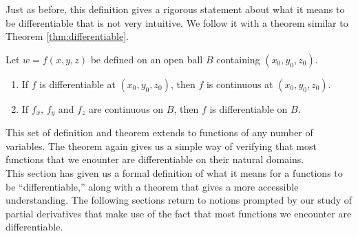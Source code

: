 Just as before, this definition gives a rigorous statement about what it means to be differentiable that is not very intuitive. We follow it with a theorem similar to Theorem \ref{thm:differentiable}.

{Let $w=f(x,y,z)$ be defined on an open ball $B$ containing $(x_0,y_0,z_0)$. 
\begin{enumerate}
\item	If $f$ is differentiable at $(x_0,y_0,z_0)$, then $f$ is continuous at $(x_0,y_0,z_0)$.
\item If $f_x$, $f_y$  and $f_z$ are continuous on $B$, then $f$ is differentiable on $B$.
\end{enumerate}
}

This set of definition and theorem extends to functions of any number of variables. The theorem again gives us a simple way of verifying that most functions that we enounter are differentiable on their natural domains.\\


This section has given us a formal definition of what it means for a functions to be ``differentiable,'' along with a theorem that gives a more accessible understanding. The following sections return to notions prompted by our study of partial derivatives that make use of the fact that most functions we encounter are differentiable.

